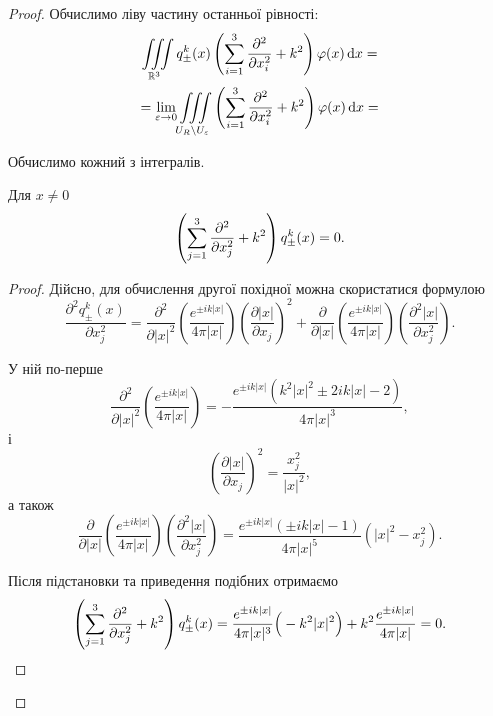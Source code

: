 \begin{proof}
	Обчислимо ліву частину останньої рівності:
	\begin{multline}
		\displaystyle\iiint\limits_{\mathbb{R}^3} q_\pm^k(x)\left( \displaystyle\sum\limits_{i = 1}^3 \frac{\partial^2}{\partial x_i^2} + k^2 \right) \varphi(x) \mathop{}\!\mathrm{d} x = \\
		= \displaystyle\lim\limits_{\varepsilon \to 0} \displaystyle\iiint\limits_{U_R \setminus U_\varepsilon} \left( \sum_{i = 1}^3 \frac{\partial^2}{\partial x_i^2} + k^2 \right) \varphi(x) \mathop{}\!\mathrm{d} x =
	\end{multline}
	 
	Обчислимо кожний з інтегралів.

	\begin{proposition}
		Для $x \ne 0$
		\begin{equation}
			\left( \displaystyle\sum\limits_{j = 1}^3 \frac{\partial^2}{\partial x_j^2} + k^2 \right) q_\pm^k(x) = 0.
		\end{equation}
	\end{proposition}

	\begin{proof}
		Дійсно, для обчислення другої похідної можна скористатися формулою
		\begin{equation}
			\frac{\partial^2 q_\pm^k(x)}{\partial x_j^2} = \frac{\partial^2}{\partial|x|^2} \left( \frac{e^{\pm ik|x|}}{4\pi|x|}\right)\left(\frac{\partial|x|}{\partial x_j}\right)^2 + \frac{\partial}{\partial|x|} \left( \frac{e^{\pm ik|x|}}{4\pi|x|}\right)\left(\frac{\partial^2|x|}{\partial x_j^2}\right).
		\end{equation}
		
		У ній по-перше
		\begin{equation}
			\frac{\partial^2}{\partial |x|^2} \left(\frac{e^{\pm ik|x|}}{4\pi|x|}\right)=-\frac{e^{\pm ik|x|}(k^2|x|^2\pm2ik|x|-2)}{4\pi|x|^3},
		\end{equation}
		і
		\begin{equation}
			\left( \frac{\partial|x|}{\partial x_j}\right)^2 = \frac{x_j^2}{|x|^2},
		\end{equation}
		а також
		\begin{equation}
			\frac{\partial}{\partial|x|}\left( \frac{e^{\pm ik|x|}}{4\pi|x|}\right)\left(\frac{\partial^2|x|}{\partial x_j^2}\right) = \frac{e^{\pm ik|x|}(\pm ik|x|-1)}{4\pi|x|^5} (|x|^2 - x_j^2).
		\end{equation}

		Після підстановки та приведення подібних отримаємо
		\begin{equation}
			\left( \displaystyle\sum\limits_{j = 1}^3 \frac{\partial^2}{\partial x_j^2} + k^2 \right) q_\pm^k(x)=\frac{e^{\pm ik|x|}}{4\pi|x|^3}\Big(-k^2|x|^2\Big) + k^2\frac{e^{\pm ik|x|}}{4\pi|x|} = 0.
		\end{equation}
	\end{proof}


\end{proof}
